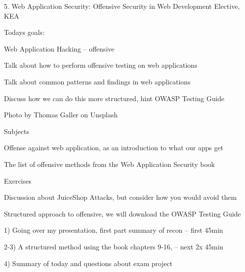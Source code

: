 \documentclass[Screen16to9,17pt]{foils}
\begin{document}
\mytitlepage
{5. Web Application Security: Offensive}
{Security in Web Development Elective, KEA}




Todays goals:
\begin{list2}
\item Web Application Hacking -- offensive
\item Talk about how to perform offensive testing on web applications
\item Talk about common patterns and findings in web applications
\item Discuss how we can do this more structured, hint OWASP Testing Guide
\end{list2}

Photo by Thomas Galler on Unsplash




\begin{list1}
\item Subjects
\begin{list2}
\item Offense against web application, as an introduction to what our apps get
\item The list of offensive methods from the Web Application Security book
\end{list2}
\item Exercises
\begin{list2}
\item Discussion about JuiceShop Attacks, but consider how you would avoid them
\end{list2}
\end{list1}


\begin{list2}
\item Structured approach to offensive, we will download the OWASP Testing Guide
\item 1) Going over my presentation, first part summary of recon -- first 45min
\item 2-3) A structured method using the book chapters 9-16,  -- next 2x 45min
\item 4) Summary of today and questions about exam project
\end{list2}
\end{document}
